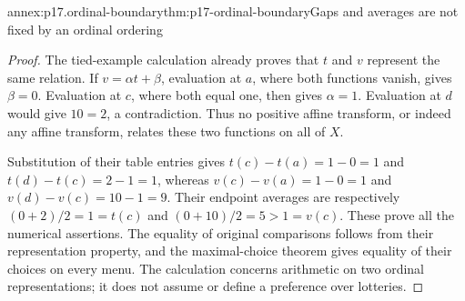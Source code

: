 \begin{annexitem}{annex:p17.ordinal-boundary}{thm:p17-ordinal-boundary}{Gaps and averages are not fixed by an ordinal ordering}
\begin{proof}
The tied-example calculation already proves that \(t\) and \(v\)
represent the same relation. If \(v=\alpha t+\beta\), evaluation at
\(a\), where both functions vanish, gives \(\beta=0\). Evaluation
at \(c\), where both equal one, then gives \(\alpha=1\).
Evaluation at \(d\) would give \(10=2\), a contradiction. Thus
no positive affine transform, or indeed any affine transform, relates
these two functions on all of \(X\).

Substitution of their table entries gives
\(t(c)-t(a)=1-0=1\) and \(t(d)-t(c)=2-1=1\), whereas
\(v(c)-v(a)=1-0=1\) and \(v(d)-v(c)=10-1=9\).
Their endpoint averages are respectively
\((0+2)/2=1=t(c)\) and \((0+10)/2=5>1=v(c)\).
These prove all the numerical assertions. The equality of original
comparisons follows from their representation property, and the
maximal-choice theorem gives equality of their choices on every menu.
The calculation concerns arithmetic on two ordinal representations; it
does not assume or define a preference over lotteries.
\end{proof}
\end{annexitem}
